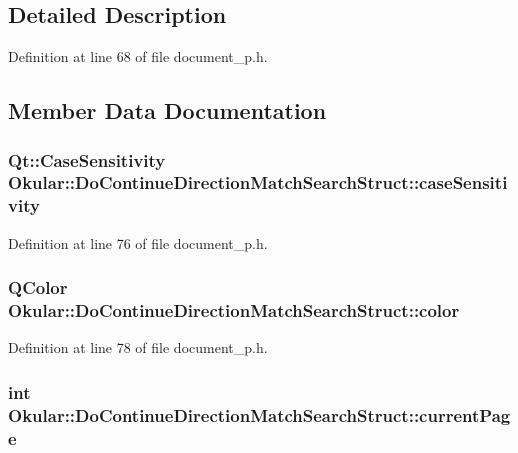 \subsection{Detailed Description}


Definition at line 68 of file document\+\_\+p.\+h.



\subsection{Member Data Documentation}
\hypertarget{structOkular_1_1DoContinueDirectionMatchSearchStruct_afe83f59649cbdbac5029e6f37c6840f5}{
\subsubsection[{case\+Sensitivity}]{\setlength{\rightskip}{0pt plus 5cm}Qt\+::\+Case\+Sensitivity Okular\+::\+Do\+Continue\+Direction\+Match\+Search\+Struct\+::case\+Sensitivity}}\label{structOkular_1_1DoContinueDirectionMatchSearchStruct_afe83f59649cbdbac5029e6f37c6840f5}


Definition at line 76 of file document\+\_\+p.\+h.

\hypertarget{structOkular_1_1DoContinueDirectionMatchSearchStruct_ae80b5fde810c935ec5436acc3821a485}{
\subsubsection[{color}]{\setlength{\rightskip}{0pt plus 5cm}Q\+Color Okular\+::\+Do\+Continue\+Direction\+Match\+Search\+Struct\+::color}}\label{structOkular_1_1DoContinueDirectionMatchSearchStruct_ae80b5fde810c935ec5436acc3821a485}


Definition at line 78 of file document\+\_\+p.\+h.

\hypertarget{structOkular_1_1DoContinueDirectionMatchSearchStruct_a52b83c7586463bfa968075de2d131250}{
\subsubsection[{current\+Page}]{\setlength{\rightskip}{0pt plus 5cm}int Okular\+::\+Do\+Continue\+Direction\+Match\+Search\+Struct\+::current\+Page}}\label{structOkular_1_1DoContinueDirectionMatchSearchStruct_a52b83c7586463bfa968075de2d131250}


